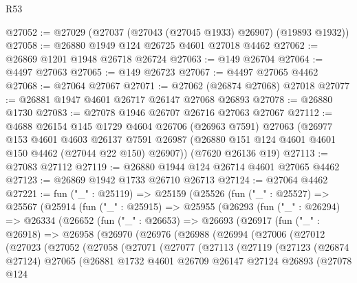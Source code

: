 \begin{lexlean}{R53}
\begin{coremodule}
@27052 := @27029 (@27037 (@27043 (@27045 @1933) @26907) (@19893 @1932))
@27058 := @26880 @1949 @124 @26725 @4601 @27018 @4462
@27062 := @26869 @1201 @1948 @26718 @26724
@27063 := @149 @26704
@27064 := @4497 @27063
@27065 := @149 @26723
@27067 := @4497 @27065 @4462
@27068 := @27064 @27067
@27071 := @27062 (@26874 @27068) @27018
@27077 := @26881 @1947 @4601 @26717 @26147 @27068 @26893
@27078 := @26880 @1730
@27083 := @27078 @1946 @26707 @26716 @27063 @27067
@27112 := @4688
    @26154
    @145
    @1729
    @4604
    @26706
    (@26963 @7591)
    @27063
    (@26977
      @153
      @4601
      @4603
      @26137
      @7591
      @26987
      (@26880 @151 @124 @4601 @4601 @150 @4462 (@27044 @22 @150) @26907))
    (@7620 @26136 @19)
@27113 := @27083 @27112
@27119 := @26880 @1944 @124 @26714 @4601 @27065 @4462
@27123 := @26869 @1942 @1733 @26710 @26713
@27124 := @27064 @4462
@27221 := fun ("_" : @25119) =>
  @25159
    (@25526
      (fun ("_" : @25527) =>
      @25567
        (@25914
          (fun ("_" : @25915) =>
          @25955
            (@26293
              (fun ("_" : @26294) =>
              @26334
                (@26652
                  (fun ("_" : @26653) =>
                  @26693
                    (@26917
                      (fun ("_" : @26918) =>
                      @26958
                        (@26970
                          (@26976
                            (@26988
                              (@26994
                                (@27006
                                  (@27012
                                    (@27023
                                      (@27052
                                        (@27058
                                          (@27071
                                            (@27077
                                              (@27113
                                                (@27119
                                                  (@27123
                                                    (@26874 @27124)
                                                    @27065
                                                    (@26881
                                                      @1732
                                                      @4601
                                                      @26709
                                                      @26147
                                                      @27124
                                                      @26893
                                                      (@27078
                                                        @124

\end{coremodule}
\end{lexlean}
